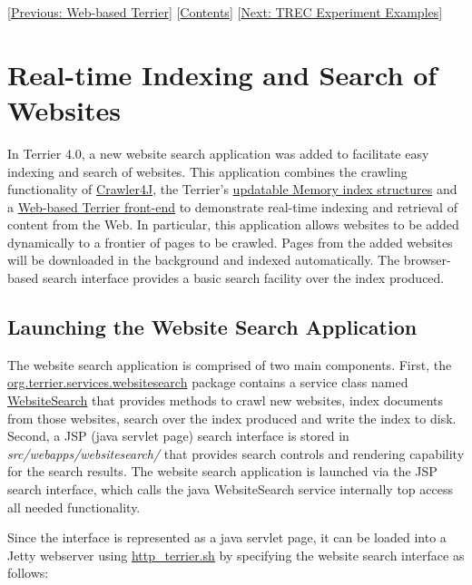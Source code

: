 {[}\href{terrier_http.html}{Previous: Web-based Terrier}{]}
{[}\href{index.html}{Contents}{]} {[}\href{trec_examples.html}{Next:
TREC Experiment Examples}{]}\\

\section{Real-time Indexing and Search of
Websites}\label{real-time-indexing-and-search-of-websites}

In Terrier 4.0, a new website search application was added to facilitate
easy indexing and search of websites. This application combines the
crawling functionality of
\href{http://code.google.com/p/crawler4j/}{Crawler4J}, the Terrier's
\href{realtime_indices.html}{updatable Memory index structures} and a
\href{terrier_http.html}{Web-based Terrier front-end} to demonstrate
real-time indexing and retrieval of content from the Web. In particular,
this application allows websites to be added dynamically to a frontier
of pages to be crawled. Pages from the added websites will be downloaded
in the background and indexed automatically. The browser-based search
interface provides a basic search facility over the index produced.

\subsection{Launching the Website Search
Application}\label{launching-the-website-search-application}

The website search application is comprised of two main components.
First, the
\href{javadoc/org/terrier/services/websitesearch/package-summary.html}{org.terrier.services.websitesearch}
package contains a service class named
\href{javadoc/org/terrier/services/websitesearch/WebsiteSearch.html}{WebsiteSearch}
that provides methods to crawl new websites, index documents from those
websites, search over the index produced and write the index to disk.
Second, a JSP (java servlet page) search interface is stored in
\emph{src/webapps/websitesearch/} that provides search controls and
rendering capability for the search results. The website search
application is launched via the JSP search interface, which calls the
java WebsiteSearch service internally top access all needed
functionality.

Since the interface is represented as a java servlet page, it can be
loaded into a Jetty webserver using
\href{terrier_http.html}{http\_terrier.sh} by specifying the website
search interface as follows:

